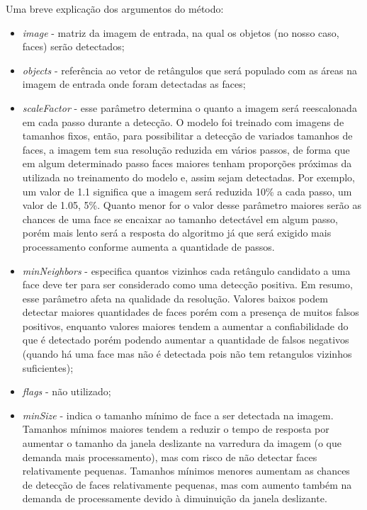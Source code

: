 
Uma breve explicação dos argumentos do método:

\begin{itemize}
    \item \emph{image} - matriz da imagem de entrada, na qual os objetos (no nosso caso, faces) serão detectados;
    \item \emph{objects} - referência ao vetor de retângulos que será populado com as áreas na imagem de entrada onde foram detectadas as faces;
    \item \emph{scaleFactor} - esse parâmetro determina o quanto a imagem será reescalonada em cada passo durante a detecção. O modelo foi treinado com imagens de tamanhos fixos, então, para possibilitar a detecção de variados tamanhos de faces, a imagem tem sua resolução reduzida em vários passos, de forma que em algum determinado passo faces maiores tenham proporções próximas da utilizada no treinamento do modelo e, assim sejam detectadas. Por exemplo, um valor de 1.1 significa que a imagem será reduzida 10\% a cada passo, um valor de 1.05, 5\%. Quanto menor for o valor desse parâmetro maiores serão as chances de uma face se encaixar ao tamanho detectável em algum passo, porém mais lento será a resposta do algoritmo já que será exigido mais processamento conforme aumenta a quantidade de passos.
    \item \emph{minNeighbors} - especifica quantos vizinhos cada retângulo candidato a uma face deve ter para ser considerado como uma detecção positiva. Em resumo, esse parâmetro afeta na qualidade da resolução. Valores baixos podem detectar maiores quantidades de faces porém com a presença de muitos falsos positivos, enquanto valores maiores tendem a aumentar a confiabilidade do que é detectado porém podendo aumentar a quantidade de falsos negativos (quando há uma face mas não é detectada pois não tem retangulos vizinhos suficientes);
    \item \emph{flags} - não utilizado;
    \item \emph{minSize} - indica o tamanho mínimo de face a ser detectada na imagem. Tamanhos mínimos maiores tendem a reduzir o tempo de resposta por aumentar o tamanho da janela deslizante na varredura da imagem (o que demanda mais processamento), mas com risco de não detectar faces relativamente pequenas. Tamanhos mínimos menores aumentam as chances de detecção de faces relativamente pequenas, mas com aumento também na demanda de processamente devido à dimuinuição da janela deslizante.
\end{itemize}


